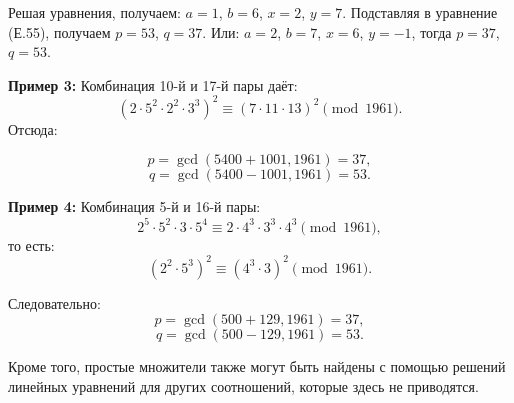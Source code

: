 Решая уравнения, получаем: $a = 1$, $b = 6$, $x = 2$, $y = 7$. Подставляя в
уравнение (Е.55), получаем $p = 53$, $q = 37$. Или: $a = 2$, $b = 7$, $x = 6$,
$y = -1$, тогда $p = 37$, $q = 53$.

\textbf{Пример 3:} Комбинация 10-й и 17-й пары даёт:
\begin{equation}
(2 \cdot 5^2 \cdot 2^2 \cdot 3^3)^2 \equiv (7 \cdot 11 \cdot 13)^2 \pmod{1961}.
\end{equation}
Отсюда:

\begin{equation}
p = \gcd(5400 + 1001, 1961) = 37,
\end{equation}
\begin{equation}
q = \gcd(5400 - 1001, 1961) = 53.
\end{equation}

\textbf{Пример 4:} Комбинация 5-й и 16-й пары:
\begin{equation}
2^5 \cdot 5^2 \cdot 3 \cdot 5^4 \equiv 2 \cdot 4^3 \cdot 3^3 \cdot 4^3 \pmod{1961},
\end{equation}
то есть:
\begin{equation}
(2^2 \cdot 5^3)^2 \equiv (4^3 \cdot 3)^2 \pmod{1961}.
\end{equation}

Следовательно:
\begin{equation}
p = \gcd(500 + 129, 1961) = 37,
\end{equation}
\begin{equation}
q = \gcd(500 - 129, 1961) = 53.
\end{equation}

Кроме того, простые множители также могут быть найдены с помощью решений
линейных уравнений для других соотношений, которые здесь не приводятся.

